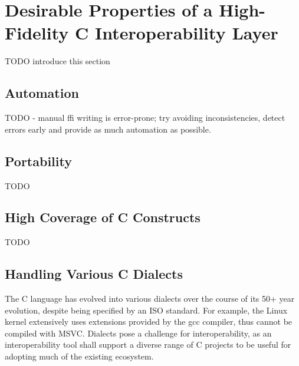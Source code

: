 \section{Desirable Properties of a High-Fidelity C Interoperability Layer}
\label{sec:desirable_properties}
TODO introduce this section

\subsection{Automation}
TODO - manual ffi writing is error-prone; try avoiding inconsistencies, detect errors early and provide as much automation as possible.

\subsection{Portability}
TODO

\subsection{High Coverage of C Constructs}
TODO

\subsection{Handling Various C Dialects}

The C language has evolved into various dialects over the course of its 50+ year evolution, despite being specified by an ISO standard. For example, the Linux kernel extensively uses extensions provided by the gcc compiler, thus cannot be compiled with MSVC. Dialects pose a challenge for interoperability, as an interoperability tool shall support a diverse range of C projects to be useful for adopting much of the existing ecosystem.

